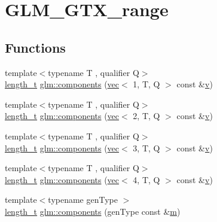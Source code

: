 \hypertarget{group__gtx__range}{}\section{G\+L\+M\+\_\+\+G\+T\+X\+\_\+range}
\label{group__gtx__range}
\subsection*{Functions}
\begin{DoxyCompactItemize}
\item 
{\footnotesize template$<$typename T , qualifier Q$>$ }\\\mbox{\hyperlink{namespaceglm_a090a0de2260835bee80e71a702492ed9}{length\+\_\+t}} \mbox{\hyperlink{group__gtx__range_gaf2831875a8cee7cc000abadba2aa1265}{glm\+::components}} (\mbox{\hyperlink{structglm_1_1vec}{vec}}$<$ 1, T, Q $>$ const \&\mbox{\hyperlink{_s_d_l__opengl_8h_a10a82eabcb59d2fcd74acee063775f90}{v}})
\item 
{\footnotesize template$<$typename T , qualifier Q$>$ }\\\mbox{\hyperlink{namespaceglm_a090a0de2260835bee80e71a702492ed9}{length\+\_\+t}} \mbox{\hyperlink{group__gtx__range_ga30085e4904149502aac186e95d5604bf}{glm\+::components}} (\mbox{\hyperlink{structglm_1_1vec}{vec}}$<$ 2, T, Q $>$ const \&\mbox{\hyperlink{_s_d_l__opengl_8h_a10a82eabcb59d2fcd74acee063775f90}{v}})
\item 
{\footnotesize template$<$typename T , qualifier Q$>$ }\\\mbox{\hyperlink{namespaceglm_a090a0de2260835bee80e71a702492ed9}{length\+\_\+t}} \mbox{\hyperlink{group__gtx__range_gae7c3451f88f2550ed896da642cdbfd2d}{glm\+::components}} (\mbox{\hyperlink{structglm_1_1vec}{vec}}$<$ 3, T, Q $>$ const \&\mbox{\hyperlink{_s_d_l__opengl_8h_a10a82eabcb59d2fcd74acee063775f90}{v}})
\item 
{\footnotesize template$<$typename T , qualifier Q$>$ }\\\mbox{\hyperlink{namespaceglm_a090a0de2260835bee80e71a702492ed9}{length\+\_\+t}} \mbox{\hyperlink{group__gtx__range_ga6a306e940263c39ce05d378f68a7caff}{glm\+::components}} (\mbox{\hyperlink{structglm_1_1vec}{vec}}$<$ 4, T, Q $>$ const \&\mbox{\hyperlink{_s_d_l__opengl_8h_a10a82eabcb59d2fcd74acee063775f90}{v}})
\item 
{\footnotesize template$<$typename gen\+Type $>$ }\\\mbox{\hyperlink{namespaceglm_a090a0de2260835bee80e71a702492ed9}{length\+\_\+t}} \mbox{\hyperlink{group__gtx__range_ga946358ba868fc33d234e7ee3ac1b7912}{glm\+::components}} (gen\+Type const \&\mbox{\hyperlink{_s_d_l__opengl__glext_8h_af593500c283bf1a787a6f947f503a5c2}{m}})

\end{DoxyCompactItemize}
